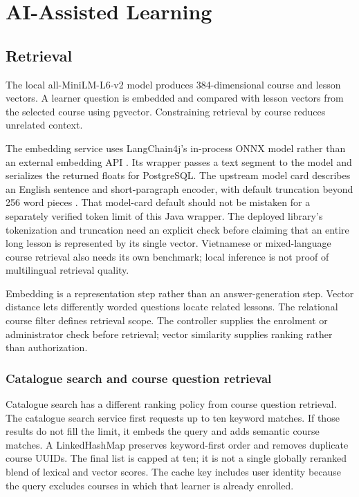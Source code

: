 \documentclass[12pt,a4paper,oneside]{report}
\begin{document}
\chapter{AI-Assisted Learning}
\section{Retrieval}
The local all-MiniLM-L6-v2 model produces 384-dimensional course and lesson vectors.
A learner question is embedded and compared with lesson vectors from the selected course
using pgvector. Constraining retrieval by course reduces unrelated context.

The embedding service uses LangChain4j's in-process ONNX model rather than an
external embedding API \cite{langchainonnx}. Its wrapper passes a text segment to
the model and serializes the returned floats for PostgreSQL. The upstream model card
describes an English sentence and short-paragraph encoder, with default truncation
beyond 256 word pieces \cite{minilmmodel}. That model-card default should not be
mistaken for a separately verified token limit of this Java wrapper. The deployed
library's tokenization and truncation need an explicit check before claiming that an
entire long lesson is represented by its single vector. Vietnamese or mixed-language
course retrieval also needs its own benchmark; local inference is not proof of
multilingual retrieval quality.

Embedding is a representation step rather than an answer-generation step. Vector
distance lets differently worded questions locate related lessons. The relational
course filter defines retrieval scope. The controller supplies the enrolment or
administrator check before retrieval; vector similarity supplies ranking rather than
authorization.

\subsection{Catalogue search and course question retrieval}
Catalogue search has a different ranking policy from course question retrieval.
The catalogue search service first requests up to ten keyword matches. If those
results do not fill the limit, it embeds the query and adds semantic course matches.
A LinkedHashMap preserves keyword-first order and removes duplicate course UUIDs.
The final list is capped at ten; it is not a single globally reranked blend of lexical
and vector scores. The cache key includes user identity because the query excludes
courses in which that learner is already enrolled.
\end{document}
